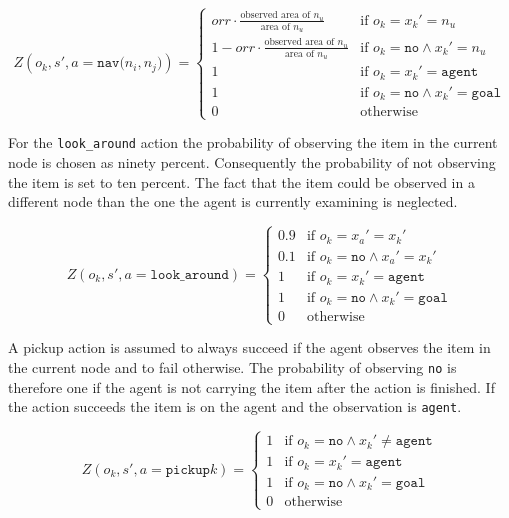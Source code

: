 \begin{equation}\label{eq:Onav}
    Z(o_k, s', a=\texttt{nav($n_i, n_j$)}) = \begin{cases} orr \cdot \frac{\text{observed area of }n_u}{\text{area of }n_u} & \text{if }o_k=x_k'=n_u \\ 1 - orr \cdot \frac{\text{observed area of }n_u}{\text{area of }n_u} & \text{if } o_k=\texttt{no}\land x_k'=n_u\\
    1 & \text{if }o_k=x_k'=\texttt{agent}\\
    1 & \text{if }o_k=\texttt{no}\land x_k'=\texttt{goal}\\
    0 & \text{otherwise}
    \end{cases}
\end{equation}

For the \texttt{look\_around} action the probability of observing the item in the current node is chosen as ninety percent. Consequently the probability of not observing the item is set to ten percent. The fact that the item could be observed in a different node than the one the agent is currently examining is neglected. 

\begin{equation}\label{eq:lookaround}
    Z(o_k, s', a=\texttt{look\_around}) = \begin{cases}
    0.9& \text{if } o_k=x_a'=x_k'\\
    0.1 &\text{if } o_k=\texttt{no} \land x_a'=x_k'\\
    1& \text{if }o_k=x_k'=\texttt{agent}\\
    1& \text{if }o_k=\texttt{no}\land x_k'=\texttt{goal}
    \\0 &\text{otherwise} \end{cases}
\end{equation}

A pickup action is assumed to always succeed if the agent observes the item in the current node and to fail otherwise. The probability of observing \texttt{no} is therefore one if the agent is not carrying the item after the action is finished. If the action succeeds the item is on the agent and the observation is \texttt{agent}. 

\begin{equation}\label{eq:pickup}
    Z(o_k, s', a=\texttt{pickup}k) = \begin{cases}
    1 &\text{if } o_k=\texttt{no} \land x_k'\neq \texttt{agent}\\
    1& \text{if }o_k=x_k'=\texttt{agent}\\
    1& \text{if }o_k=\texttt{no}\land x_k'=\texttt{goal}
    \\0 &\text{otherwise} \end{cases}
\end{equation}

